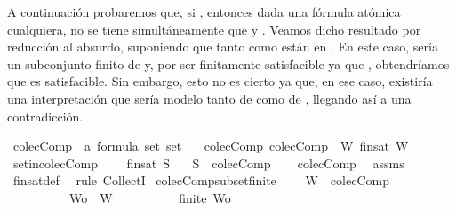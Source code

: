 \begin{isabellebody}
\begin{isamarkuptext}
\begin{demostracion}
    A continuación probaremos que, si , entonces dada  una fórmula atómica cualquiera, no 
    se tiene simultáneamente que  y . Veamos dicho resultado por reducción al 
    absurdo, suponiendo que tanto  como  están en . En este caso,  sería un
    subconjunto finito de  y, por ser  finitamente satisfacible ya que , obtendríamos 
    que  es satisfacible. Sin embargo, esto no es cierto ya que, en ese caso, existiría
    una interpretación que sería modelo tanto de  como de , llegando así a una 
    contradicción.
  \end{demostracion}%
\end{isamarkuptext}\isamarkuptrue%
\isamarkupfalse%
\ colecComp\ {\isacharcolon}{\isacharcolon}\ {\isachardoublequoteopen}{\isacharparenleft}{\isacharprime}a\ formula\ set{\isacharparenright}\ set{\isachardoublequoteclose}\isanewline
\ \ \ colecComp{\isacharcolon}\ {\isachardoublequoteopen}colecComp\ {\isacharequal}\ {\isacharbraceleft}W{\isachardot}\ fin{\isacharunderscore}sat\ W{\isacharbraceright}{\isachardoublequoteclose}\isanewline
\isanewline
{}\isamarkupfalse%
\ set{\isacharunderscore}in{\isacharunderscore}colecComp{\isacharcolon}\ \isanewline
\ \ \ {\isachardoublequoteopen}fin{\isacharunderscore}sat\ S{\isachardoublequoteclose}\isanewline
\ \ \ {\isachardoublequoteopen}S\ {\isasymin}\ colecComp{\isachardoublequoteclose}\isanewline
%
\isadelimproof
\ \ %
\endisadelimproof
%
\isatagproof
{}\isamarkupfalse%
\ colecComp\ \isamarkupfalse%
\ assms\ \isamarkupfalse%
\ fin{\isacharunderscore}sat{\isacharunderscore}def\ \isamarkupfalse%
\ {\isacharparenleft}rule\ CollectI{\isacharparenright}%
\endisatagproof
{\isafoldproof}%
%
\isadelimproof
\isanewline
%
\endisadelimproof
\isanewline
{}\isamarkupfalse%
\ colecComp{\isacharunderscore}subset{\isacharunderscore}finite{\isacharcolon}\ \isanewline
\ \ \ {\isachardoublequoteopen}W\ {\isasymin}\ colecComp{\isachardoublequoteclose}\isanewline
\ \ \ \ \ \ \ \ \ \ {\isachardoublequoteopen}Wo\ {\isasymsubseteq}\ W{\isachardoublequoteclose}\isanewline
\ \ \ \ \ \ \ \ \ \ {\isachardoublequoteopen}finite\ Wo{\isachardoublequoteclose}\isanewline

\end{isabellebody}

